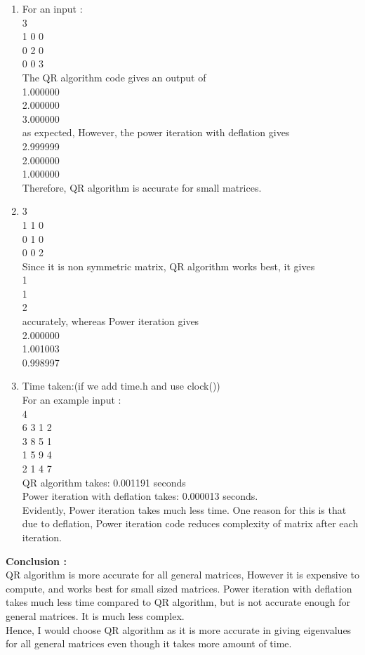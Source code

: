\documentclass[journal]{IEEEtran}
\begin{document}
\begin{enumerate}
    \item For an input :\\
    3\\
    1 0 0\\
    0 2 0\\
    0 0 3\\
    The QR algorithm code gives an output of \\
    1.000000\\2.000000\\3.000000\\ as expected, However, the power iteration with deflation gives\\ 2.999999\\ 2.000000 \\ 1.000000\\ Therefore, QR algorithm is accurate for small matrices. 
    \item 3\\
    1 1 0\\
     0 1 0\\
     0 0 2\\
     Since it is non symmetric matrix, QR algorithm works best, it gives\\ 1\\1\\2\\ accurately, whereas Power iteration gives \\
    2.000000\\
    1.001003\\
    0.998997\\
    \item Time taken:(if we add time.h and use clock())\\
    For an example input :\\
4\\
6 3 1 2\\
3 8 5 1\\
1 5 9 4\\
2 1 4 7\\
QR algorithm takes: 0.001191 seconds\\
Power iteration with deflation takes: 0.000013 seconds.\\
Evidently, Power iteration takes much less time. One reason for this is that due to deflation, Power iteration code reduces complexity of matrix after each iteration.
\end{enumerate}
\textbf{Conclusion :}\\
QR algorithm is more accurate for all general matrices, However it is expensive to compute, and works best for small sized matrices. Power iteration with deflation takes much less time compared to QR algorithm, but is not accurate enough for general matrices. It is much less complex.\\
Hence, I would choose QR algorithm as it is more accurate in giving eigenvalues for all general matrices even though it takes more amount of time.\\
\end{document}
